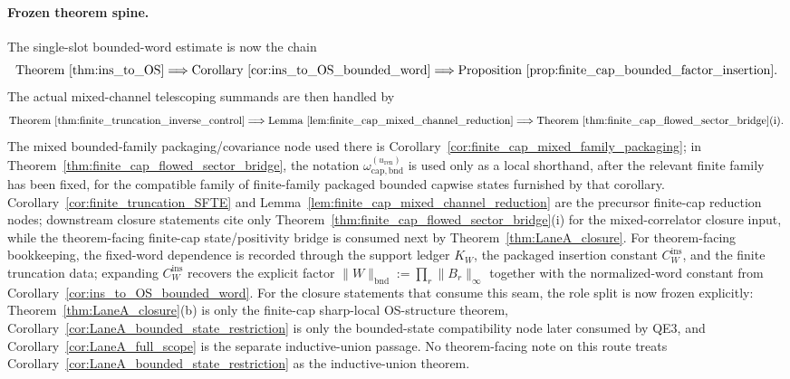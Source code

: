 \paragraph{Frozen theorem spine.}
The single-slot bounded-word estimate is now the chain
\[
\text{Theorem~\ref{thm:ins_to_OS}}
\Longrightarrow
\text{Corollary~\ref{cor:ins_to_OS_bounded_word}}
\Longrightarrow
\text{Proposition~\ref{prop:finite_cap_bounded_factor_insertion}}.
\]
The actual mixed-channel telescoping summands are then handled by
\[
\text{Theorem~\ref{thm:finite_truncation_inverse_control}}
\Longrightarrow
\text{Lemma~\ref{lem:finite_cap_mixed_channel_reduction}}
\Longrightarrow
\text{Theorem~\ref{thm:finite_cap_flowed_sector_bridge}(i)}.
\]
The mixed bounded-family packaging/covariance node used there is Corollary~\ref{cor:finite_cap_mixed_family_packaging}; in Theorem~\ref{thm:finite_cap_flowed_sector_bridge}, the notation
\(
\omega_{\mathrm{cap,bnd}}^{(u_{\mathrm{ren}})}
\)
is used only as a local shorthand, after the relevant finite family has been fixed, for the compatible family of finite-family packaged bounded capwise states furnished by that corollary.
Corollary~\ref{cor:finite_truncation_SFTE} and Lemma~\ref{lem:finite_cap_mixed_channel_reduction} are the precursor finite-cap reduction nodes; downstream closure statements cite only Theorem~\ref{thm:finite_cap_flowed_sector_bridge}(i) for the mixed-correlator closure input, while the theorem-facing finite-cap state/positivity bridge is consumed next by Theorem~\ref{thm:LaneA_closure}.
For theorem-facing bookkeeping, the fixed-word dependence is recorded through the support ledger $K_W$, the packaged insertion constant $C_W^{\mathrm{ins}}$, and the finite truncation data; expanding $C_W^{\mathrm{ins}}$ recovers the explicit factor $\|W\|_{\mathrm{bnd}}:=\prod_r \|B_r\|_\infty$ together with the normalized-word constant from Corollary~\ref{cor:ins_to_OS_bounded_word}.
For the closure statements that consume this seam, the role split is now frozen explicitly: Theorem~\ref{thm:LaneA_closure}(b) is only the finite-cap sharp-local OS-structure theorem, Corollary~\ref{cor:LaneA_bounded_state_restriction} is only the bounded-state compatibility node later consumed by QE3, and Corollary~\ref{cor:LaneA_full_scope} is the separate inductive-union passage. No theorem-facing note on this route treats Corollary~\ref{cor:LaneA_bounded_state_restriction} as the inductive-union theorem.

